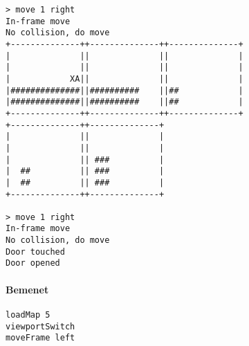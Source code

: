 \begin{verbatim}
> move 1 right
In-frame move
No collision, do move
+--------------++--------------++--------------+
|              ||              ||              |
|              ||              ||              |
|            XA||              ||              |
|##############||##########    ||##            |
|##############||##########    ||##            |
+--------------++--------------++--------------+
+--------------++--------------+                
|              ||              |                
|              ||              |                
|              || ###          |                
|  ##          || ###          |                
|  ##          || ###          |                
+--------------++--------------+                

> move 1 right
In-frame move
No collision, do move
Door touched
Door opened
\end{verbatim}
		        
		        \paragraph*{Bemenet}
\begin{verbatim}
loadMap 5
viewportSwitch
moveFrame left
\end{verbatim}
